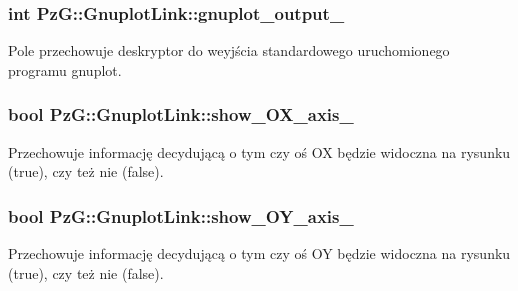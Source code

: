 \subsubsection[{\texorpdfstring{gnuplot\+\_\+output\+\_\+}{gnuplot_output_}}]{\setlength{\rightskip}{0pt plus 5cm}int Pz\+G\+::\+Gnuplot\+Link\+::gnuplot\+\_\+output\+\_\+\hspace{0.3cm}{\ttfamily [protected]}}\hypertarget{class_pz_g_1_1_gnuplot_link_a3ba099cef3e84aab2d3d0f7e99661cca}{}\label{class_pz_g_1_1_gnuplot_link_a3ba099cef3e84aab2d3d0f7e99661cca}
Pole przechowuje deskryptor do weyjścia standardowego uruchomionego programu gnuplot. 
\subsubsection[{\texorpdfstring{show\+\_\+\+O\+X\+\_\+axis\+\_\+}{show_OX_axis_}}]{\setlength{\rightskip}{0pt plus 5cm}bool Pz\+G\+::\+Gnuplot\+Link\+::show\+\_\+\+O\+X\+\_\+axis\+\_\+\hspace{0.3cm}{\ttfamily [protected]}}\hypertarget{class_pz_g_1_1_gnuplot_link_a694fd1200f95c4e8c1fcb0bfe30ab711}{}\label{class_pz_g_1_1_gnuplot_link_a694fd1200f95c4e8c1fcb0bfe30ab711}
Przechowuje informację decydującą o tym czy oś OX będzie widoczna na rysunku ({\ttfamily true}), czy też nie ({\ttfamily false}). 
\subsubsection[{\texorpdfstring{show\+\_\+\+O\+Y\+\_\+axis\+\_\+}{show_OY_axis_}}]{\setlength{\rightskip}{0pt plus 5cm}bool Pz\+G\+::\+Gnuplot\+Link\+::show\+\_\+\+O\+Y\+\_\+axis\+\_\+\hspace{0.3cm}{\ttfamily [protected]}}\hypertarget{class_pz_g_1_1_gnuplot_link_a6e6dbfa4c5d4ee81ef83afc1b4ad1be4}{}\label{class_pz_g_1_1_gnuplot_link_a6e6dbfa4c5d4ee81ef83afc1b4ad1be4}
Przechowuje informację decydującą o tym czy oś OY będzie widoczna na rysunku ({\ttfamily true}), czy też nie ({\ttfamily false}). 
